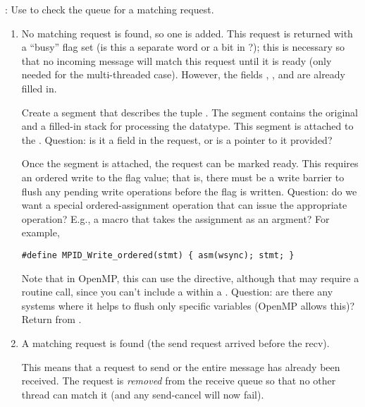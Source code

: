 \begin{mmadi}
\begin{tcp}
:
Use  to check the queue for a matching
request.   
\begin{enumerate}
\item No matching request is found, so one is added.
This request is returned with a ``busy'' flag set (is this a separate word or
a bit  in ?); this is
necessary so that no incoming message will match this request until it is
ready (only needed for the multi-threaded case).  However, the fields
, 
, and  are already
filled in.  

Create a segment that describes the tuple .
The segment contains the original  and a filled-in
stack  for processing the datatype.  This
segment is attached to the .  Question: is it a field
in the request, or is a pointer to it provided?  

Once the segment is attached, the request can be marked ready.
This requires an ordered write to the flag value; that is, there must be a write barrier to flush any pending write
operations before the flag is written.
Question: do we want a special ordered-assignment operation that can issue the
appropriate operation?  E.g., a  macro that takes
the assignment as an argment?  For example,
\begin{verbatim}
#define MPID_Write_ordered(stmt) { asm(wsync); stmt; }
\end{verbatim}
Note that in OpenMP, this can use the  directive, although that
may require a routine call, since you can't include a  within a
.  Question: are there any systems where it helps to flush only
specific variables  (OpenMP allows this)?
Return from .

\item A matching request is found (the send request arrived before the recv).

This means that a request to send or the entire message has already been
received. 
The request is \emph{removed} from the receive queue so that no other thread
can match it (and any send-cancel will now fail).


\end{enumerate}
\end{tcp}
\end{mmadi}

